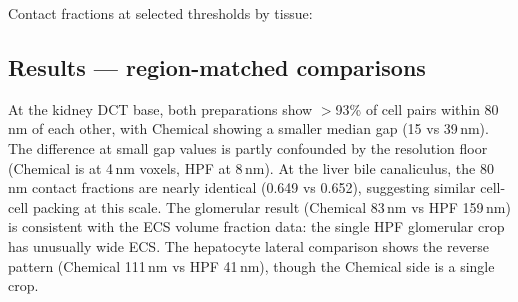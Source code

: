 \documentclass[times, twoside]{zHenriquesLab-StyleBioRxiv}
\begin{document}
Contact fractions at selected thresholds by tissue:

\begin{table}[h]
\centering
{}
\end{table}

\subsection*{Results --- region-matched comparisons}

\begin{table}[h]
\centering
\caption{Voronoi gap median and contact fraction at 80\,nm for anatomically matched regions.}
\label{tab:gap_matched}
\end{table}

At the kidney DCT base, both preparations show $>$93\% of cell pairs within 80\,nm of each other, with Chemical showing a smaller median gap (15 vs 39\,nm). The difference at small gap values is partly confounded by the resolution floor (Chemical is at 4\,nm voxels, HPF at 8\,nm). At the liver bile canaliculus, the 80\,nm contact fractions are nearly identical (0.649 vs 0.652), suggesting similar cell-cell packing at this scale. The glomerular result (Chemical 83\,nm vs HPF 159\,nm) is consistent with the ECS volume fraction data: the single HPF glomerular crop has unusually wide ECS. The hepatocyte lateral comparison shows the reverse pattern (Chemical 111\,nm vs HPF 41\,nm), though the Chemical side is a single crop.
\end{document}

